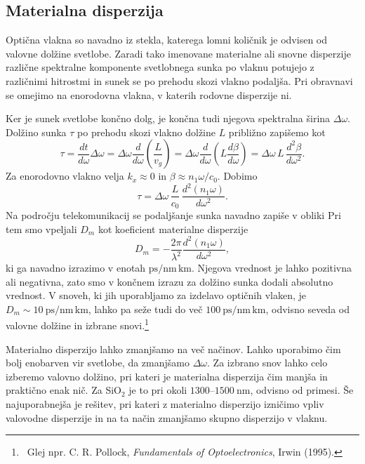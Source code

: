 \subsection*{Materialna disperzija}
Optična vlakna so navadno iz stekla, katerega lomni količnik je odvisen 
od valovne dolžine svetlobe. Zaradi tako imenovane materialne ali snovne disperzije različne 
spektralne komponente svetlobnega sunka po vlaknu potujejo z različnimi hitrostmi 
in sunek se po prehodu skozi vlakno podaljša. Pri obravnavi
se omejimo na enorodovna vlakna, v katerih rodovne disperzije ni. 

Ker je sunek svetlobe končno dolg, je končna tudi njegova spektralna širina 
$\Delta \omega$. 
Dolžino sunka $\tau$ po prehodu skozi vlakno dolžine $L$ približno zapišemo kot
\begin{equation}
\tau = \frac{dt}{d\omega}\Delta \omega = 
\Delta \omega \frac{d}{d\omega}\left(\frac{L}{v_g}\right)
= \Delta \omega \frac{d}{d\omega}\left(L \frac{d\beta}{d\omega}\right) =
\Delta \omega\, L\, \frac{d^2 \beta}{d \omega^2}.
\label{dispračun}
\end{equation}
Za enorodovno vlakno velja $k_x \approx 0$ in $\beta \approx n_1 \omega/c_0$. Dobimo  
\begin{equation}
\tau = \Delta \omega\, \frac{L}{c_0}\,\frac{d^2 (n_1 \omega)}{d \omega^2}.
\end{equation}
Na področju telekomunikacij se podaljšanje sunka navadno zapiše v obliki
Pri tem smo vpeljali $D_m$ kot koeficient materialne disperzije
\begin{equation}
D_m = - \frac{2\pi}{\lambda^2}\frac{d^2(n_1 \omega)}{d\omega^2},
\end{equation}
ki ga navadno izrazimo v enotah $\si{\pico\second/\nano\meter\, \kilo\meter}$.
Njegova vrednost je lahko pozitivna ali negativna, zato smo v končnem izrazu za dolžino 
sunka dodali absolutno vrednost. V snoveh, ki jih uporabljamo za izdelavo optičnih vlaken, 
je $D_m \sim 10~\si{\pico\second/\nano\meter\, \kilo\meter}$, lahko pa seže
tudi do več $100~\si{\pico\second/\nano\meter\, \kilo\meter}$, odvisno seveda od valovne dolžine
in izbrane snovi.\footnote{~Glej npr. C. R. Pollock, {\it Fundamentals of Optoelectronics}, 
Irwin (1995).}

Materialno disperzijo lahko zmanjšamo na več načinov. Lahko uporabimo čim bolj enobarven
vir svetlobe, da zmanjšamo $\Delta \omega$. Za izbrano snov lahko celo izberemo valovno 
dolžino, pri kateri je materialna disperzija čim manjša in praktično enak nič. Za 
SiO$_2$ je to pri okoli $1300$--$1500~\si{\nano\meter}$, odvisno 
od primesi. Še najuporabnejša je rešitev, pri kateri 
z materialno disperzijo izničimo vpliv valovodne disperzije in na ta način zmanjšamo skupno 
disperzijo v vlaknu.


